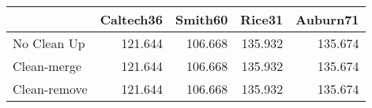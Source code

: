 \begin{tabular}{lrrrr}
\toprule
{} & Caltech36 & Smith60 &  Rice31 & Auburn71 \\
\midrule
No Clean Up  &   121.644 & 106.668 & 135.932 &  135.674 \\
Clean-merge  &   121.644 & 106.668 & 135.932 &  135.674 \\
Clean-remove &   121.644 & 106.668 & 135.932 &  135.674 \\
\bottomrule
\end{tabular}

